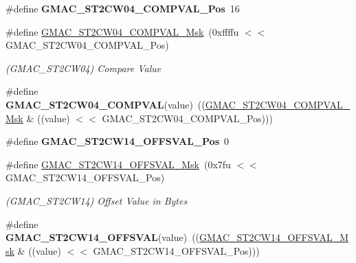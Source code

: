 \begin{DoxyCompactItemize}
\item 
\mbox{\label{group__SAMV71__GMAC_ga17bb7bc450aeda5e82c91e61132378c4}} 
\#define {\bfseries G\+M\+A\+C\+\_\+\+S\+T2\+C\+W04\+\_\+\+C\+O\+M\+P\+V\+A\+L\+\_\+\+Pos}~16
\item 
\mbox{\label{group__SAMV71__GMAC_gaf395aed83489a7df656bd43f1b89c043}} 
\#define \mbox{\hyperlink{group__SAMV71__GMAC_gaf395aed83489a7df656bd43f1b89c043}{G\+M\+A\+C\+\_\+\+S\+T2\+C\+W04\+\_\+\+C\+O\+M\+P\+V\+A\+L\+\_\+\+Msk}}~(0xffffu $<$$<$ G\+M\+A\+C\+\_\+\+S\+T2\+C\+W04\+\_\+\+C\+O\+M\+P\+V\+A\+L\+\_\+\+Pos)
\begin{DoxyCompactList}\small\item\em (G\+M\+A\+C\+\_\+\+S\+T2\+C\+W04) Compare Value \end{DoxyCompactList}\item 
\mbox{\label{group__SAMV71__GMAC_gac5c4956a0393e613980b427d23590974}} 
\#define {\bfseries G\+M\+A\+C\+\_\+\+S\+T2\+C\+W04\+\_\+\+C\+O\+M\+P\+V\+AL}(value)~((\mbox{\hyperlink{group__SAMV71__GMAC_gaf395aed83489a7df656bd43f1b89c043}{G\+M\+A\+C\+\_\+\+S\+T2\+C\+W04\+\_\+\+C\+O\+M\+P\+V\+A\+L\+\_\+\+Msk}} \& ((value) $<$$<$ G\+M\+A\+C\+\_\+\+S\+T2\+C\+W04\+\_\+\+C\+O\+M\+P\+V\+A\+L\+\_\+\+Pos)))
\item 
\mbox{\label{group__SAMV71__GMAC_ga5f4a301e7a019811028dfa4078930595}} 
\#define {\bfseries G\+M\+A\+C\+\_\+\+S\+T2\+C\+W14\+\_\+\+O\+F\+F\+S\+V\+A\+L\+\_\+\+Pos}~0
\item 
\mbox{\label{group__SAMV71__GMAC_ga8266494cf10d0b97cd2948761a8a4962}} 
\#define \mbox{\hyperlink{group__SAMV71__GMAC_ga8266494cf10d0b97cd2948761a8a4962}{G\+M\+A\+C\+\_\+\+S\+T2\+C\+W14\+\_\+\+O\+F\+F\+S\+V\+A\+L\+\_\+\+Msk}}~(0x7fu $<$$<$ G\+M\+A\+C\+\_\+\+S\+T2\+C\+W14\+\_\+\+O\+F\+F\+S\+V\+A\+L\+\_\+\+Pos)
\begin{DoxyCompactList}\small\item\em (G\+M\+A\+C\+\_\+\+S\+T2\+C\+W14) Offset Value in Bytes \end{DoxyCompactList}\item 
\mbox{\label{group__SAMV71__GMAC_gacce1a148f84966dca5275a0008040c4c}} 
\#define {\bfseries G\+M\+A\+C\+\_\+\+S\+T2\+C\+W14\+\_\+\+O\+F\+F\+S\+V\+AL}(value)~((\mbox{\hyperlink{group__SAMV71__GMAC_ga8266494cf10d0b97cd2948761a8a4962}{G\+M\+A\+C\+\_\+\+S\+T2\+C\+W14\+\_\+\+O\+F\+F\+S\+V\+A\+L\+\_\+\+Msk}} \& ((value) $<$$<$ G\+M\+A\+C\+\_\+\+S\+T2\+C\+W14\+\_\+\+O\+F\+F\+S\+V\+A\+L\+\_\+\+Pos)))

\end{DoxyCompactItemize}
